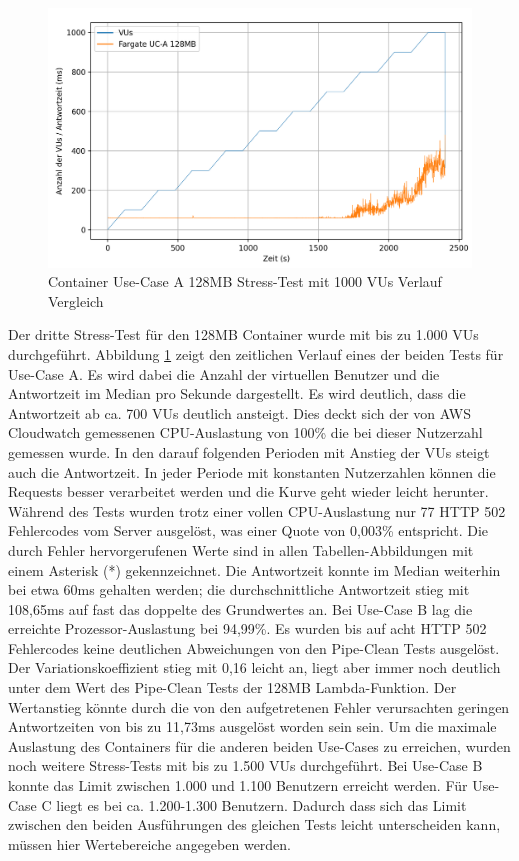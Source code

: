 \begin{figure}[H]
    \includegraphics[width=\textwidth]{img/fargate128-stress1000-uca-example-graph.png}
    \caption[Container Use-Case A 128MB Stress-Test mit 1000 VUs Verlauf Vergleich]{Container Use-Case A 128MB Stress-Test mit 1000 VUs Verlauf Vergleich}
    \label{fig:fargate128-stress1000-uca-example-graph}
\end{figure}

Der dritte Stress-Test für den 128MB Container wurde mit bis zu 1.000 \acp{VU} durchgeführt. Abbildung \ref{fig:fargate128-stress1000-uca-example-graph} zeigt den zeitlichen Verlauf eines der beiden Tests für Use-Case A. Es wird dabei die Anzahl der virtuellen Benutzer und die Antwortzeit im Median pro Sekunde dargestellt. Es wird deutlich, dass die Antwortzeit ab ca. 700 \acp{VU} deutlich ansteigt. Dies deckt sich der von \ac{AWS} Cloudwatch gemessenen CPU-Auslastung von 100\% die bei dieser Nutzerzahl gemessen wurde. In den darauf folgenden Perioden mit Anstieg der \acp{VU} steigt auch die Antwortzeit. In jeder Periode mit konstanten Nutzerzahlen können die Requests besser verarbeitet werden und die Kurve geht wieder leicht herunter. Während des Tests wurden trotz einer vollen CPU-Auslastung nur 77 HTTP 502 Fehlercodes vom Server ausgelöst, was einer Quote von 0,003\% entspricht. Die durch Fehler hervorgerufenen Werte sind in allen Tabellen-Abbildungen mit einem Asterisk (*) gekennzeichnet. Die Antwortzeit konnte im Median weiterhin bei etwa 60ms gehalten werden; die durchschnittliche Antwortzeit stieg mit 108,65ms auf fast das doppelte des Grundwertes an.
Bei Use-Case B lag die erreichte Prozessor-Auslastung bei 94,99\%. Es wurden bis auf acht HTTP 502 Fehlercodes keine deutlichen Abweichungen von den Pipe-Clean Tests ausgelöst. Der Variationskoeffizient stieg mit 0,16 leicht an, liegt aber immer noch deutlich unter dem Wert des Pipe-Clean Tests der 128MB Lambda-Funktion. Der Wertanstieg könnte durch die von den aufgetretenen Fehler verursachten geringen Antwortzeiten von bis zu 11,73ms ausgelöst worden sein sein. 
Um die maximale Auslastung des Containers für die anderen beiden Use-Cases zu erreichen, wurden noch weitere Stress-Tests mit bis zu 1.500 \acp{VU} durchgeführt. Bei Use-Case B konnte das Limit zwischen 1.000 und 1.100 Benutzern erreicht werden. Für Use-Case C liegt es bei ca. 1.200-1.300 Benutzern. Dadurch dass sich das Limit zwischen den beiden Ausführungen des gleichen Tests leicht unterscheiden kann, müssen hier Wertebereiche angegeben werden.

